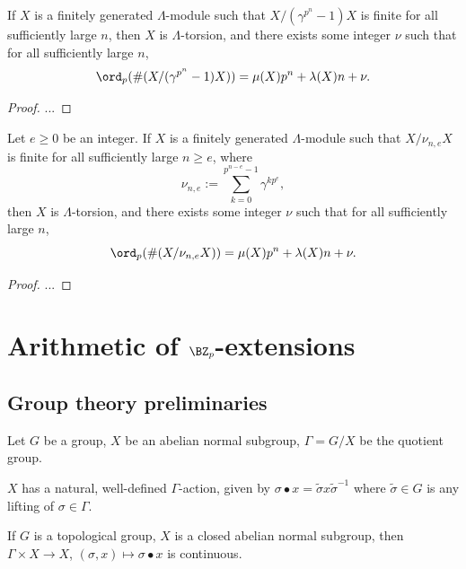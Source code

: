 \begin{prop}
\label{coinvariant-growth}
If $X$ is a finitely generated
$\Lambda$-module such that $X/(\gamma^{p^n}-1)X$ is finite
for all sufficiently large $n$,
then $X$ is $\Lambda$-torsion, and
there exists some integer $\nu$
such that for all sufficiently large $n$,
$$
\ord_p(\#(X/(\gamma^{p^n}-1)X))=\mu(X)p^n
+\lambda(X)n+\nu.
$$
\end{prop}

\begin{proof}
...
\end{proof}

\begin{prop}
\label{coinvariant-growth-2}
Let $e\geq 0$ be an integer.
If $X$ is a finitely generated
$\Lambda$-module such that $X/\nu_{n,e}X$ is finite
for all sufficiently large $n\geq e$, where
$$
\nu_{n,e}:=\sum_{k=0}^{p^{n-e}-1}\gamma^{kp^e},
$$
then $X$ is $\Lambda$-torsion, and
there exists some integer $\nu$
such that for all sufficiently large $n$,
$$
\ord_p(\#(X/\nu_{n,e}X))=\mu(X)p^n
+\lambda(X)n+\nu.
$$
\end{prop}

\begin{proof}
...
\end{proof}

\section{Arithmetic of $\BZ_p$-extensions}

\subsection{Group theory preliminaries}

Let $G$ be a group, $X$ be an abelian normal subgroup,
$\Gamma=G/X$ be the quotient group.

\begin{definition}
\label{conjugate-action}
$X$ has a natural, well-defined $\Gamma$-action,
given by $\sigma\bullet x
=\widetilde\sigma x\widetilde\sigma^{-1}$
where $\widetilde\sigma\in G$ is any lifting of $\sigma\in\Gamma$.
\end{definition}

\begin{lem}
\label{conjugate-action-cont}
If $G$ is a topological group, $X$ is a closed abelian normal subgroup,
then $\Gamma\times X\to X$, $(\sigma,x)\mapsto\sigma\bullet x$
is continuous.
\end{lem}

